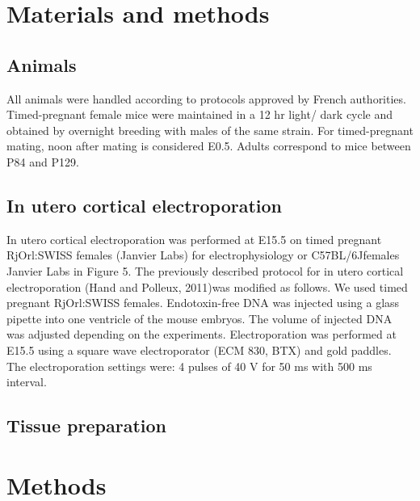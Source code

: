 \documentclass[10pt,letterpaper]{article}
\begin{document}
\section*{Materials and methods}
\subsection*{Animals}
All animals were handled according to protocols approved by French authorities. Timed-pregnant female mice were maintained in a 12 hr light/ dark cycle and obtained by overnight breeding with males of the same strain. For timed-pregnant mating, noon after mating is considered E0.5. Adults correspond to mice between P84 and P129.

\subsection*{In utero cortical electroporation}
In   utero cortical   electroporation   was   performed at   E15.5 on   timed   pregnant RjOrl:SWISS females (Janvier Labs) for electrophysiology or C57BL/6Jfemales Janvier Labs in Figure 5. 
The previously described protocol for in utero cortical  electroporation (Hand  and  Polleux,  2011)was  modified  as  follows.  We  used  timed  pregnant  RjOrl:SWISS females. Endotoxin-free  DNA  was injected  using  a  glass  pipette  into  one  ventricle  of  the  mouse  embryos.  The  volume  of  injected  DNA  was  adjusted depending  on  the  experiments.  Electroporation  was  performed  at  E15.5  using  a  square  wave  electroporator  (ECM 830,  BTX)  and  gold  paddles.  The  electroporation  settings  were:  4  pulses  of  40  V  for  50  ms  with  500  ms  interval. 

\subsection*{Tissue preparation}

\appendix
\section{Methods}
\end{document}
